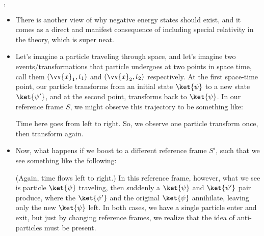 \sep


\begin{itemize}
    \item There is another view of why negative energy states should exist, and it comes as a direct and manifest consequence of including special relativity in the theory, which is super neat.
    \item Let's imagine a particle traveling through space, and let's imagine two events/transformations that particle undergoes at two points in space time, call them $(\vv{x}_1,t_1)$ and $(\vv{x}_2,t_2)$ respectively. At the first space-time point, our particle transforms from an initial state $\ket{\psi}$ to a new state $\ket{\psi'}$, and at the second point, transforms back to $\ket{\psi}$. In our reference frame $S$, we might observe this trajectory to be something like:
        \begin{center}
        \end{center}
        Time here goes from left to right. So, we observe one particle transform once, then transform again.
    \item Now, what happens if we boost to a different reference frame $S'$, such that we see something like the following:
        \begin{center}
        \end{center}
        (Again, time flows left to right.) In this reference frame, however, what we see is particle $\ket{\psi}$ traveling, then suddenly a $\ket{\psi}$ and $\ket{\psi'}$ pair produce, where the $\ket{\psi'}$ and the original $\ket{\psi}$ annihilate, leaving only the new $\ket{\psi}$ left. In both cases, we have a single particle enter and exit, but just by changing reference frames, we realize that the idea of anti-particles must be present.
\end{itemize}
